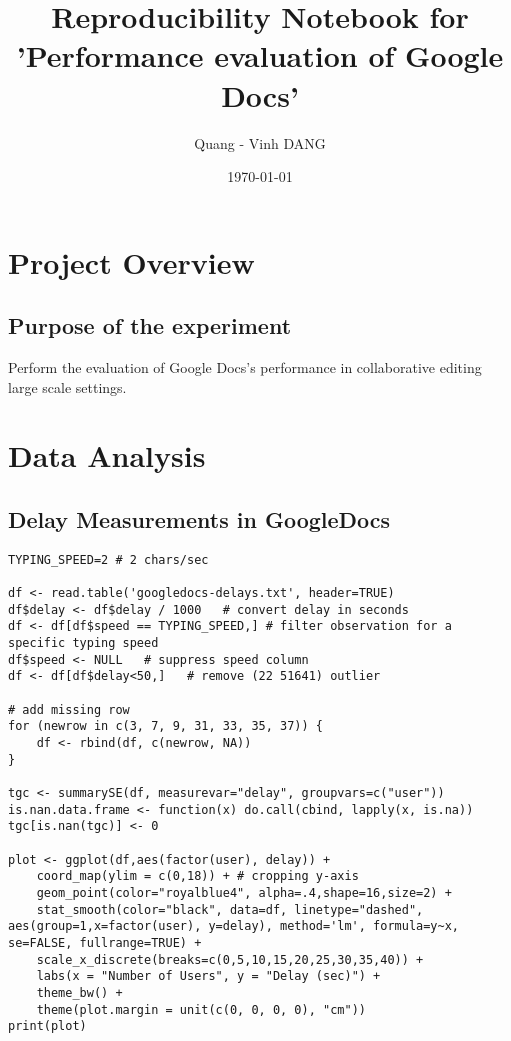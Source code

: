 \documentclass[10pt]{article}
\author{Quang - Vinh DANG}
\date{\today}
\title{Reproducibility Notebook for 'Performance evaluation of Google Docs'}
\begin{document}
\maketitle
\tableofcontents

\makeatletter
\renewcommand{\verbatim@font}{\ttfamily\footnotesize}
\makeatother


\section{Project Overview}
\label{sec-1}

\subsection{Purpose of the experiment}
\label{sec-1-1}
Perform the evaluation of Google Docs's performance in collaborative editing large scale settings.


\section{Data Analysis}
\label{sec-2}

\subsection{Delay Measurements in GoogleDocs}
\label{sec-2-1}

\begin{verbatim}
TYPING_SPEED=2 # 2 chars/sec

df <- read.table('googledocs-delays.txt', header=TRUE)
df$delay <- df$delay / 1000   # convert delay in seconds
df <- df[df$speed == TYPING_SPEED,] # filter observation for a specific typing speed
df$speed <- NULL   # suppress speed column
df <- df[df$delay<50,]   # remove (22 51641) outlier

# add missing row 
for (newrow in c(3, 7, 9, 31, 33, 35, 37)) {
    df <- rbind(df, c(newrow, NA))  
}

tgc <- summarySE(df, measurevar="delay", groupvars=c("user"))
is.nan.data.frame <- function(x) do.call(cbind, lapply(x, is.na))
tgc[is.nan(tgc)] <- 0

plot <- ggplot(df,aes(factor(user), delay)) +
    coord_map(ylim = c(0,18)) + # cropping y-axis
    geom_point(color="royalblue4", alpha=.4,shape=16,size=2) +
    stat_smooth(color="black", data=df, linetype="dashed", aes(group=1,x=factor(user), y=delay), method='lm', formula=y~x, se=FALSE, fullrange=TRUE) +
    scale_x_discrete(breaks=c(0,5,10,15,20,25,30,35,40)) +
    labs(x = "Number of Users", y = "Delay (sec)") + 
    theme_bw() +
    theme(plot.margin = unit(c(0, 0, 0, 0), "cm"))
print(plot)
\end{verbatim}
\end{document}
